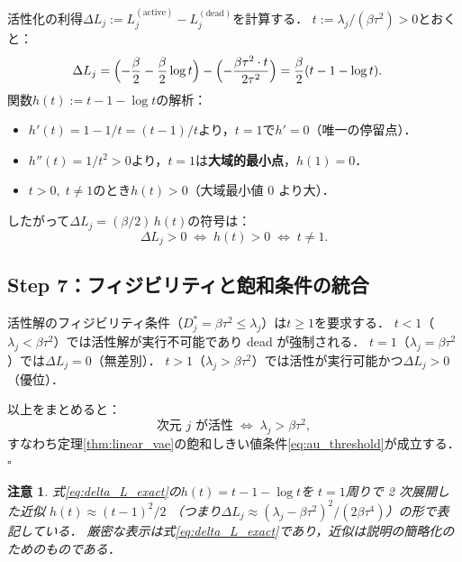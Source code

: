 \documentclass[11pt,a4paper]{jsarticle}
\newtheorem{remark}{注意}
\begin{document}
活性化の利得$\Delta L_j := L_j^{(\mathrm{active})} - L_j^{(\mathrm{dead})}$を計算する．
$t := \lambda_j / (\beta\tau^2) > 0$とおくと：
\begin{align}
  \Delta L_j
  &= \Bigl(-\frac{\beta}{2} - \frac{\beta}{2}\log t\Bigr) - \Bigl(-\frac{\beta\tau^2 \cdot t}{2\tau^2}\Bigr)
   = \frac{\beta}{2}(t - 1 - \log t).
  \label{eq:delta_L_exact}
\end{align}
関数$h(t) := t - 1 - \log t$の解析：
\begin{itemize}
  \item $h'(t) = 1 - 1/t = (t-1)/t$より，$t=1$で$h'=0$（唯一の停留点）．
  \item $h''(t) = 1/t^2 > 0$より，$t=1$は\textbf{大域的最小点}，$h(1) = 0$．
  \item $t > 0,\; t \neq 1$のとき$h(t) > 0$（大域最小値 0 より大）．
\end{itemize}
したがって$\Delta L_j = (\beta/2)\,h(t)$の符号は：
\begin{equation}
  \Delta L_j > 0
  \;\Longleftrightarrow\;
  h(t) > 0
  \;\Longleftrightarrow\;
  t \neq 1.
  \label{eq:delta_sign}
\end{equation}

\subsection*{Step 7：フィジビリティと飽和条件の統合}

活性解のフィジビリティ条件（$D_j^* = \beta\tau^2 \leq \lambda_j$）は$t \geq 1$を要求する．
$t < 1$（$\lambda_j < \beta\tau^2$）では活性解が実行不可能であり dead が強制される．
$t = 1$（$\lambda_j = \beta\tau^2$）では$\Delta L_j = 0$（無差別）．
$t > 1$（$\lambda_j > \beta\tau^2$）では活性が実行可能かつ$\Delta L_j > 0$（優位）．

以上をまとめると：
\begin{equation}
  \text{次元 }j\text{ が活性} \;\Longleftrightarrow\; \lambda_j > \beta\tau^2,
\end{equation}
すなわち定理\ref{thm:linear_vae}の飽和しきい値条件\eqref{eq:au_threshold}が成立する．\hfill$\square$

\begin{remark}
式\eqref{eq:delta_L_exact}の$h(t) = t - 1 - \log t$を
$t = 1$周りで 2 次展開した近似
$h(t) \approx (t-1)^2/2$
（つまり$\Delta L_j \approx (\lambda_j - \beta\tau^2)^2/(2\beta\tau^4)$）の形で表記している．
厳密な表示は式\eqref{eq:delta_L_exact}であり，近似は説明の簡略化のためのものである．
\end{remark}
\end{document}
